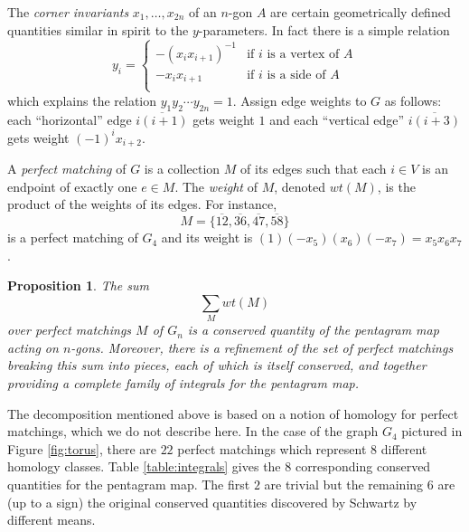 \documentclass{amsart}
\newtheorem{proposition}[theorem]{Proposition}
\theoremstyle{definition}
\theoremstyle{remark}
\numberwithin{equation}{section}
\begin{document}
	The \emph{corner invariants} $x_1,\ldots, x_{2n}$ of an $n$-gon $A$ are certain geometrically defined quantities similar in spirit to the $y$-parameters.  In fact there is a simple relation
	\begin{displaymath}
		y_i = \begin{cases}
		-(x_ix_{i+1})^{-1} & \textrm{if $i$ is a vertex of $A$} \\
		-x_ix_{i+1} & \textrm{if $i$ is a side of $A$} \\
		\end{cases}
	\end{displaymath}
	which explains the relation $y_1y_2\cdots y_{2n}=1$.  Assign edge weights to $G$ as follows: each ``horizontal'' edge $\overline{i(i+1)}$ gets weight $1$ and each ``vertical edge'' $\overline{i(i+3)}$ gets weight $(-1)^ix_{i+2}$.  
	
	A \emph{perfect matching} of $G$ is a collection $M$ of its edges such that each $i \in V$ is an endpoint of exactly one $e \in M$.  The \emph{weight} of $M$, denoted $wt(M)$, is the product of the weights of its edges.  For instance, 
	\begin{displaymath}
		M = \{\overline{12}, \overline{36}, \overline{47}, \overline{58}\}
	\end{displaymath}
	is a perfect matching of $G_4$ and its weight is $(1)(-x_5)(x_6)(-x_7) = x_5x_6x_7$.
	
	\begin{proposition}
		The sum
		\begin{displaymath}
			\sum_M wt(M)
		\end{displaymath}
		over perfect matchings $M$ of $G_n$ is a conserved quantity of the pentagram map acting on $n$-gons.  Moreover, there is a refinement of the set of perfect matchings breaking this sum into pieces, each of which is itself conserved, and together providing a complete family of integrals for the pentagram map.
	\end{proposition}
	
	The decomposition mentioned above is based on a notion of homology for perfect matchings, which we do not describe here.  In the case of the graph $G_4$ pictured in Figure \ref{fig:torus}, there are $22$ perfect matchings which represent $8$ different homology classes.  Table \ref{table:integrals} gives the $8$ corresponding conserved quantities for the pentagram map.  The first $2$ are trivial but the remaining $6$ are (up to a sign) the original conserved quantities discovered by Schwartz \cite{S08} by different means.
	
\end{document}
